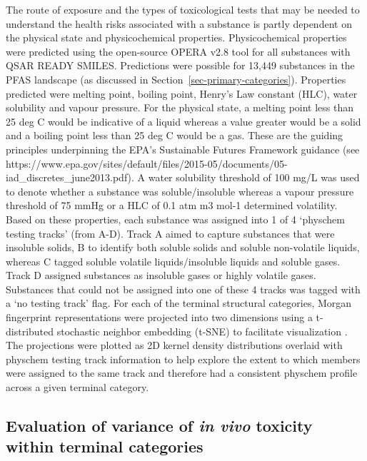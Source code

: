\documentclass[
  super,
  preprint,
  3p]{elsarticle}
\begin{document}
The route of exposure and the types of toxicological tests that may be
needed to understand the health risks associated with a substance is
partly dependent on the physical state and physicochemical properties.
Physicochemical properties were predicted using the open-source OPERA
v2.8 tool \citep{mansouri_opera_2018} for all substances with QSAR READY
SMILES. Predictions were possible for 13,449 substances in the PFAS
landscape (as discussed in Section~\ref{sec-primary-categories}).
Properties predicted were melting point, boiling point, Henry's Law
constant (HLC), water solubility and vapour pressure. For the physical
state, a melting point less than 25 deg C would be indicative of a
liquid whereas a value greater would be a solid and a boiling point less
than 25 deg C would be a gas. These are the guiding principles
underpinning the EPA's Sustainable Futures Framework guidance (see
https://www.epa.gov/sites/default/files/2015-05/documents/05-iad\_discretes\_june2013.pdf).
A water solubility threshold of 100 mg/L was used to denote whether a
substance was soluble/insoluble whereas a vapour pressure threshold of
75 mmHg or a HLC of 0.1 atm m3 mol-1 determined volatility. Based on
these properties, each substance was assigned into 1 of 4 `physchem
testing tracks' (from A-D). Track A aimed to capture substances that
were insoluble solids, B to identify both soluble solids and soluble
non-volatile liquids, whereas C tagged soluble volatile
liquids/insoluble liquids and soluble gases. Track D assigned substances
as insoluble gases or highly volatile gases. Substances that could not
be assigned into one of these 4 tracks was tagged with a `no testing
track' flag. For each of the terminal structural categories, Morgan
fingerprint representations were projected into two dimensions using a
t-distributed stochastic neighbor embedding (t-SNE) to facilitate
visualization \citep{van_er_maaten_visualizing_2018}. The projections
were plotted as 2D kernel density distributions overlaid with physchem
testing track information to help explore the extent to which members
were assigned to the same track and therefore had a consistent physchem
profile across a given terminal category.

\hypertarget{sec-invivo}{%
\subsection{\texorpdfstring{Evaluation of variance of \emph{in vivo}
toxicity within terminal
categories}{Evaluation of variance of in vivo toxicity within terminal categories}}\label{sec-invivo}}
\end{document}
